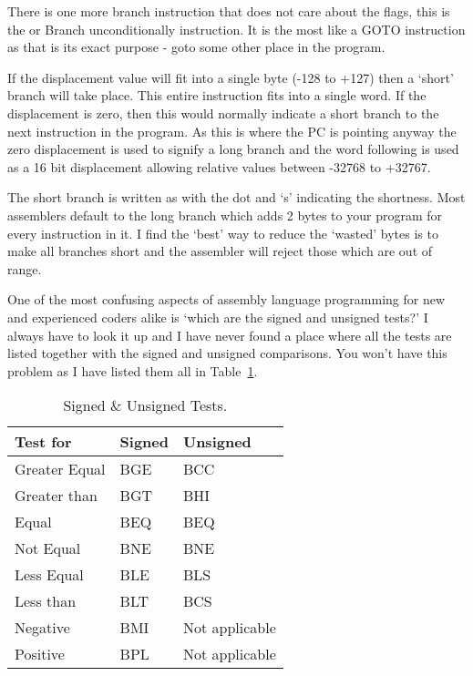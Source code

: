 There is one more branch instruction that does not care about the
    flags, this is the  or Branch unconditionally instruction. It is the
    most like a GOTO instruction as that is its exact purpose -{} goto some
    other place in the program.

If the displacement value will fit into a single byte (-{}128 to +127)
    then a `short' branch will take place. This entire instruction fits into a
    single word. If the displacement is zero, then this would normally
    indicate a short branch to the next instruction in the program. As this is
    where the PC is pointing anyway the zero displacement is used to signify a
    long branch and the word following is used as a 16 bit displacement
    allowing relative values between -{}32768 to +32767.

The short branch is written as  with the dot and `s' indicating
    the shortness. Most assemblers default to the long branch which adds 2
    bytes to your program for every  instruction in it. I find the `best'
    way to reduce the `wasted' bytes is to make all branches short and the
    assembler will reject those which are out of range.

One of the most confusing aspects of assembly language programming
    for new and experienced coders alike is `which are the signed and unsigned
    tests?' I always have to look it up and I have never found a place where
    all the tests are listed together with the signed and unsigned
    comparisons. You won't have this problem as I have listed them all in Table~\ref{tab:SignedAndUnsignedTests}.

\begin{table}[htbp]
\centering
\begin{tabular}{l l l}
\toprule
\textbf{Test for} & \textbf{Signed} & \textbf{Unsigned}\\
\midrule
Greater Equal & BGE & BCC\\
Greater than & BGT & BHI\\
Equal & BEQ & BEQ\\
Not Equal & BNE & BNE\\
Less Equal & BLE & BLS\\
Less than & BLT & BCS\\
Negative & BMI & Not applicable\\
Positive & BPL & Not applicable\\
\bottomrule
\end{tabular}
\caption{Signed \& Unsigned Tests.}
\label{tab:SignedAndUnsignedTests}
\end{table}


